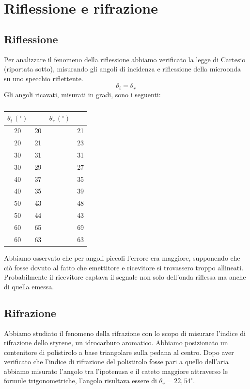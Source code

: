 \section{Riflessione e rifrazione}
\subsection{Riflessione}
Per analizzare il fenomeno della riflessione abbiamo verificato la legge di Cartesio (riportata sotto), misurando gli angoli di incidenza e riflessione della microonda su uno specchio riflettente.
\begin{equation}
    \theta_i=\theta_r
\end{equation}
\noindent
Gli angoli ricavati, misurati in gradi, sono i seguenti:

\begin{table}[h!]
    \centering
    \begin{tabular}{cccc}
    $\theta_i \, (^\circ)$ && \,$\theta_r \, (^\circ)$&\\
    \toprule
    20	&20	&&21\\
    20	&21	&&23\\
    30	&31	&&31\\
    30	&29	&&27\\
    40	&37	&&35\\
    40	&35	&&39\\
    50	&43	&&48\\
    50	&44	&&43\\
    60	&65	&&69\\
    60	&63	&&63\\
    \bottomrule
    \end{tabular}
    \caption{}
    \label{}
\end{table}

Abbiamo osservato che per angoli piccoli l'errore era maggiore, supponendo che ciò fosse dovuto al fatto che emettitore e ricevitore si trovassero troppo allineati. Probabilmente il ricevitore captava il segnale non solo dell'onda riflessa ma anche di quella emessa.
\subsection{Rifrazione}
Abbiamo studiato il fenomeno della rifrazione con lo scopo di misurare l'indice di rifrazione dello styrene, un idrocarburo aromatico.
Abbiamo posizionato un contenitore di polistirolo a base triangolare sulla pedana al centro. Dopo aver verificato che l'indice di rifrazione del polistirolo fosse pari a quello dell'aria abbiamo misurato l'angolo tra l'ipotenusa e il cateto maggiore attraverso le formule trigonometriche, l'angolo risultava essere di $\theta_v = 22,54 ^\circ$.


